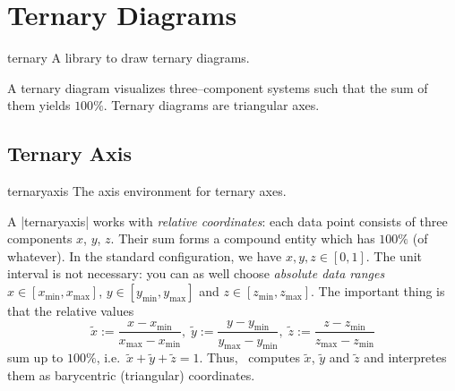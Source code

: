 \section{Ternary Diagrams}

\begin{pgfplotslibrary}{ternary}
	A library to draw ternary diagrams.

	A ternary diagram visualizes three--component systems such that the sum of them yields $100\%$. Ternary diagrams are triangular axes.
\end{pgfplotslibrary}


\subsection{Ternary Axis}
\begin{environment}{{ternaryaxis}}
	The axis environment for ternary axes.


\begin{codeexample}[]
\end{codeexample}

	A |ternaryaxis| works with \emph{relative coordinates}: each data point consists of three components $x$, $y$, $z$. Their sum forms a compound entity which has $100\%$ (of whatever). In the standard configuration, we have $x,y,z \in [0,1]$. The unit interval is not necessary: you can as well choose \emph{absolute data ranges} $x \in [x_{\text{min}},x_{\text{max}}]$, $y \in [y_{\text{min}},y_{\text{max}}]$ and $z \in [z_{\text{min}},z_{\text{max}}]$. The important thing is that the relative values 
	\[ \tilde x := \frac{x-x_{\text{min}}}{x_{\text{max}} - x_{\text{min}}},\;
	   \tilde y := \frac{y-y_{\text{min}}}{y_{\text{max}} - y_{\text{min}}},\;
	   \tilde z := \frac{z-z_{\text{min}}}{z_{\text{max}} - z_{\text{min}}} \]
	sum up to $100\%$, i.e.\ $\tilde x + \tilde y + \tilde z = 1$. Thus, \PGFPlots\ computes $\tilde x$, $\tilde y$ and $\tilde z$ and interpretes them as barycentric (triangular) coordinates.


\end{environment}
